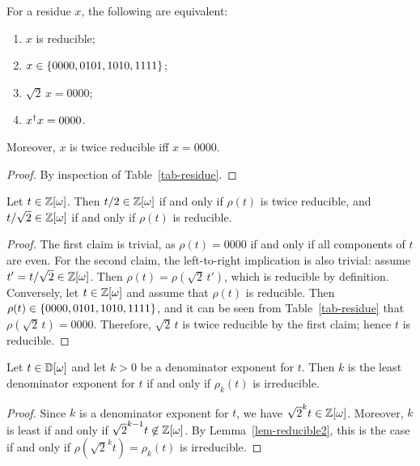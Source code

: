 \begin{lemma}\label{lem-reducible}
  For a residue $x$, the following are equivalent:
  \begin{enumerate}\alphalabels
    \item $x$ is reducible;
    \item $x\in\{0000,0101,1010,1111\}$;
    \item $\sqrt{2}\,x = 0000$;
    \item $x^{\dagger} x=0000$.
  \end{enumerate}
  Moreover, $x$ is twice reducible iff $x=0000$.
\end{lemma}

\begin{proof}
  By inspection of Table~\ref{tab-residue}.
\end{proof}

\begin{lemma}\label{lem-reducible2}
  Let $t\in\mathbb{Z}[\omega]$. Then $t/2\in\mathbb{Z}[\omega]$ if and only if $\rho(t)$ is twice reducible, and
  $t/\sqrt{2}\in\mathbb{Z}[\omega]$ if and only if $\rho(t)$ is reducible.
\end{lemma}

\begin{proof}
  The first claim is trivial, as $\rho(t)=0000$ if and only if all components of $t$ are even. For
  the second claim, the left-to-right implication is also trivial: assume $t'=t/\sqrt{2}\in\mathbb{Z}[\omega]$.
  Then $\rho(t) = \rho(\sqrt{2}\,t')$, which is reducible by definition. Conversely, let $t\in\mathbb{Z}[\omega]$
  and assume that $\rho(t)$ is reducible. Then $\rho(t)\in\{0000, 0101, 1010, 1111\}$, and it can
  be seen from Table~\ref{tab-residue} that $\rho(\sqrt{2}\,t)=0000$. Therefore, $\sqrt{2}\,t$ is
  twice reducible by the first claim; hence $t$ is reducible.
\end{proof}

\begin{corollary}\label{cor-reducible3}
  Let $t\in\mathbb{D}[\omega]$ and let $k>0$ be a denominator exponent for $t$. Then $k$ is the least denominator
  exponent for $t$ if and only if $\rho_k(t)$ is irreducible.
\end{corollary}

\begin{proof}
  Since $k$ is a denominator exponent for $t$, we have $\sqrt{2}^k t \in \mathbb{Z}[\omega]$. Moreover, $k$ is
  least if and only if $\sqrt{2}^{k-1} t\not\in\mathbb{Z}[\omega]$. By Lemma~\ref{lem-reducible2}, this is the
  case if and only if $\rho(\sqrt{2}^k t)=\rho_k(t)$ is irreducible.
\end{proof}

